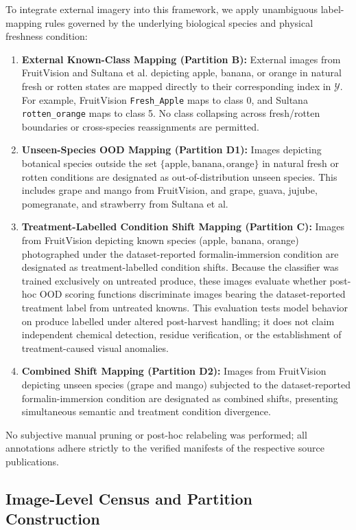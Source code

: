 To integrate external imagery into this framework, we apply unambiguous label-mapping rules governed by the underlying biological species and physical freshness condition:
\begin{enumerate}
\item \textbf{External Known-Class Mapping (Partition B):} External images from FruitVision and Sultana et al. depicting apple, banana, or orange in natural fresh or rotten states are mapped directly to their corresponding index in $\mathcal{Y}$. For example, FruitVision \texttt{Fresh\_Apple} maps to class 0, and Sultana \texttt{rotten\_orange} maps to class 5. No class collapsing across fresh/rotten boundaries or cross-species reassignments are permitted.
\item \textbf{Unseen-Species OOD Mapping (Partition D1):} Images depicting botanical species outside the set $\{\text{apple}, \text{banana}, \text{orange}\}$ in natural fresh or rotten conditions are designated as out-of-distribution unseen species. This includes grape and mango from FruitVision, and grape, guava, jujube, pomegranate, and strawberry from Sultana et al.
\item \textbf{Treatment-Labelled Condition Shift Mapping (Partition C):} Images from FruitVision depicting known species (apple, banana, orange) photographed under the dataset-reported formalin-immersion condition are designated as treatment-labelled condition shifts. Because the classifier was trained exclusively on untreated produce, these images evaluate whether post-hoc OOD scoring functions discriminate images bearing the dataset-reported treatment label from untreated knowns. This evaluation tests model behavior on produce labelled under altered post-harvest handling; it does not claim independent chemical detection, residue verification, or the establishment of treatment-caused visual anomalies.
\item \textbf{Combined Shift Mapping (Partition D2):} Images from FruitVision depicting unseen species (grape and mango) subjected to the dataset-reported formalin-immersion condition are designated as combined shifts, presenting simultaneous semantic and treatment condition divergence.
\end{enumerate}

No subjective manual pruning or post-hoc relabeling was performed; all annotations adhere strictly to the verified manifests of the respective source publications.

\subsection{Image-Level Census and Partition Construction}
\label{sec:partition_census}

